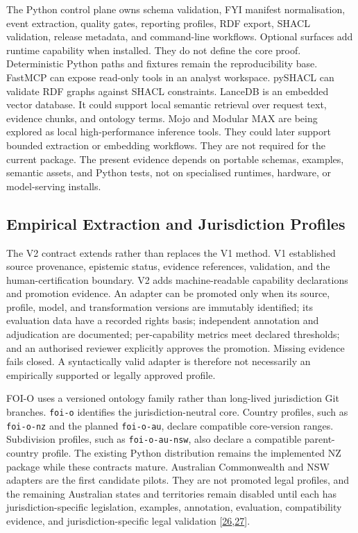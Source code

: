 \documentclass[
]{article}
\begin{document}
The Python control plane owns schema validation, FYI manifest
normalisation, event extraction, quality gates, reporting profiles, RDF
export, SHACL validation, release metadata, and command-line workflows.
Optional surfaces add runtime capability when installed. They do not
define the core proof. Deterministic Python paths and fixtures remain
the reproducibility base. FastMCP can expose read-only tools in an
analyst workspace. pySHACL can validate RDF graphs against SHACL
constraints. LanceDB is an embedded vector database. It could support
local semantic retrieval over request text, evidence chunks, and
ontology terms. Mojo and Modular MAX are being explored as local
high-performance inference tools. They could later support bounded
extraction or embedding workflows. They are not required for the current
package. The present evidence depends on portable schemas, examples,
semantic assets, and Python tests, not on specialised runtimes,
hardware, or model-serving installs.

\subsection{Empirical Extraction and Jurisdiction
Profiles}\label{empirical-extraction-and-jurisdiction-profiles}

The V2 contract extends rather than replaces the V1 method. V1
established source provenance, epistemic status, evidence references,
validation, and the human-certification boundary. V2 adds
machine-readable capability declarations and promotion evidence. An
adapter can be promoted only when its source, profile, model, and
transformation versions are immutably identified; its evaluation data
have a recorded rights basis; independent annotation and adjudication
are documented; per-capability metrics meet declared thresholds; and an
authorised reviewer explicitly approves the promotion. Missing evidence
fails closed. A syntactically valid adapter is therefore not necessarily
an empirically supported or legally approved profile.

FOI-O uses a versioned ontology family rather than long-lived
jurisdiction Git branches. \texttt{foi-o} identifies the
jurisdiction-neutral core. Country profiles, such as \texttt{foi-o-nz}
and the planned \texttt{foi-o-au}, declare compatible core-version
ranges. Subdivision profiles, such as \texttt{foi-o-au-nsw}, also
declare a compatible parent-country profile. The existing Python
distribution remains the implemented NZ package while these contracts
mature. Australian Commonwealth and NSW adapters are the first candidate
pilots. They are not promoted legal profiles, and the remaining
Australian states and territories remain disabled until each has
jurisdiction-specific legislation, examples, annotation, evaluation,
compatibility evidence, and jurisdiction-specific legal validation
{[}\hyperlink{ref-26}{26},\hyperlink{ref-27}{27}{]}.
\end{document}
